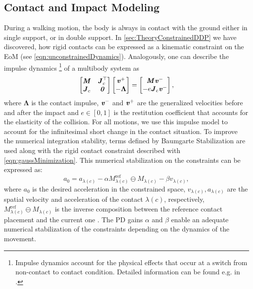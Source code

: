 \subsection{Contact and Impact Modeling}
During a walking motion, the body is always in contact with the ground either in single support, or in double support. In \cref{sec:TheoryConstrainedDDP} we have discovered, how rigid contacts can be expressed as a kinematic constraint on the \gls{EoM} (see \cref{eqn:unconstrainedDynamics}). 
Analogously, one can describe the impulse dynamics
\footnote{Impulse dynamics account for the physical effects that occur at a switch from non-contact to contact condition. Detailed information can be found e.g. in \cite{featherstone2014rigid}.} 
of a multibody system as
\begin{equation}\label{eqn:ImpulseDynamics}
\left[\begin{matrix}\bm{\mathit{M}} & \bm{\mathit{J}}^{\top}_c \\{\bm{\mathit{J}}_{c}} & \bm{\mathit{0}}\end{matrix}\right] \left[\begin{matrix} \bm{\mathit{v}}^+ \\ -\boldsymbol{\Lambda} \end{matrix}\right] = \left[\begin{matrix} \bm{\mathit{M}}\bm{\mathit{v}}^- \\ -e\bm{\mathit{J}}_c \bm{\mathit{v}}^-\end{matrix}\right],
\end{equation}
where $\boldsymbol{\Lambda}$ is the contact impulse, $\bm{\mathit{v}}^-$ and $\bm{\mathit{v}}^+$ are the generalized velocities before and after the impact and $e\in [0,1]$ is the restitution coefficient that accounts for the elasticity of the collision. For all motions, we use this impulse model to account for the infinitesimal short change in the contact situation. To improve the numerical integration stability, terms defined by Baumgarte Stabilization \cite{baumgarte1972stabilization} are used along with the rigid contact constraint described with \cref{eqn:gaussMinimization}. This numerical stabilization on the constraints can be expressed as:
\begin{equation}\label{eqn:BaumgarteStabilization}
a_0=a_{\lambda(c)}-\alpha M_{\lambda(c)}^{\text{ref}}\ominus M_{\lambda(c)}-\beta v_{\lambda(c)},
\end{equation}
where $a_0$ is the desired acceleration in the constrained space, $v_{\lambda(c)}, a_{\lambda(c)}$ are the spatial velocity and acceleration of the contact $\lambda(c)$, respectively, $M_{\lambda(c)}^{\text{ref}}\ominus M_{\lambda(c)}$ is the inverse composition between the reference contact placement and the current one \cite{mastalli20crocoddyl}. The PD gains $\alpha$ and $\beta$ enable an adequate numerical stabilization of the constraints depending on the dynamics of the movement.

